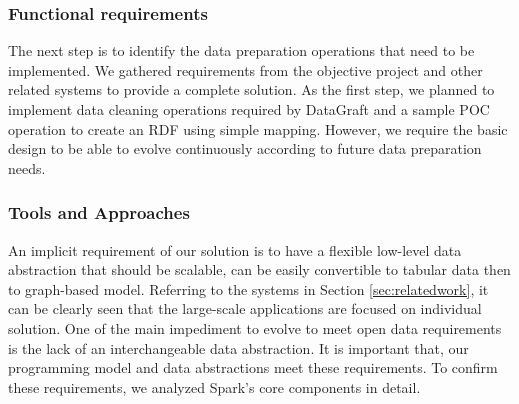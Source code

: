 \subsubsection{Functional requirements}
The next step is to identify the data preparation operations that need to be implemented. We gathered requirements from the objective project and other related systems to provide a complete solution. As the first step, we planned to implement data cleaning operations required by DataGraft and a sample POC operation to create an RDF using simple mapping. However, we require the basic design to be able to evolve continuously according to future data preparation needs.
\subsubsection{Tools and Approaches}
An implicit requirement of our solution is to have a flexible low-level data abstraction that should be scalable, can be easily convertible to tabular data then to graph-based model. Referring to the systems in Section \ref{sec:relatedwork}, it can be clearly seen that the large-scale applications are focused on individual solution. One of the main impediment to evolve to meet open data requirements is the lack of an interchangeable data abstraction. It is important that, our programming model and data abstractions meet these requirements. To confirm these requirements, we analyzed Spark's core components in detail. 
